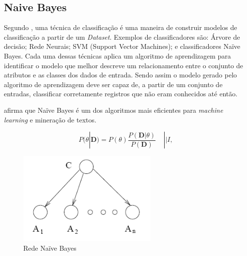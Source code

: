 \subsection{Naive Bayes}
Segundo , uma técnica de classificação é uma maneira de construir modelos de classificação a partir de um \textit{Dataset}. Exemplos de classificadores são: Árvore de decisão; Rede Neurais; SVM (Support Vector Machines); e classificadores Naïve Bayes.
Cada uma dessas técnicas aplica um algoritmo de aprendizagem para identificar o modelo que melhor descreve um relacionamento entre o conjunto de atributos e as classes dos dados de entrada. Sendo assim o modelo gerado pelo algoritmo de aprendizagem deve ser capaz de, a partir de um conjunto de entradas, classificar corretamente registros que não eram conhecidos até então.

 afirma que Naïve Bayes é um dos algoritmos mais eficientes para \textit{machine learning} e mineração de textos.


\begin{equation}
\label{eq:bayes}
P(\theta|\textbf{D}) = P(\theta ) \frac{P(\textbf{D} |\theta)}{P(\textbf{D})} ~~~~~|| I,
\end{equation}

\begin{figure}[H] %
	\caption{\label{fig:figura-bayes} Rede Naïve Bayes}
	\begin{center}
	    \includegraphics[scale=1]{figuras/figura_5.PNG} %
	\end{center}
\end{figure}

